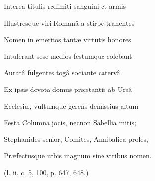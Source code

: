 {{}Interea titulis redimiti sanguini et armis

Illustresque viri Romanâ a stirpe trahentes

Nomen in emeritos tantæ virtutis honores

Intulerant sese medios festumque colebant

Auratâ fulgentes togâ sociante catervâ.

Ex ipsis devota domus præstantis ab Ursâ

Ecclesiæ, vultumque gerens demissius altum

Festa Columna jocis, necnon Sabellia mitis;

Stephanides senior, Comites, Annibalica proles,

Præfectusque urbis magnum sine viribus nomen.

(l. ii. c. 5, 100, p. 647, 648.)}

